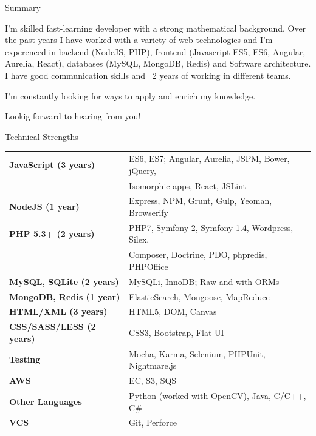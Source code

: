 \documentclass{resume} %
\begin{document}

\begin{rSection}{Summary}

I'm skilled fast-learning developer with a strong mathematical background. Over the past years I have worked with a variety of web technologies and I'm experenced in backend (NodeJS, PHP), frontend (Javascript ES5, ES6, Angular, Aurelia, React), databases (MySQL, MongoDB, Redis) and Software architecture. I have good communication skills and ~2 years of working in different teams.

I'm constantly looking for ways to apply and enrich my knowledge. 

Lookig forward to hearing from you!

\end{rSection}



\begin{rSection}{Technical Strengths}

\begin{tabular}{ @{} >{\bfseries}l @{\hspace{6ex}} l }
JavaScript (3 years) & ES6, ES7; Angular, Aurelia, JSPM, Bower, jQuery, \\
 & Isomorphic apps, React, JSLint \\
NodeJS (1 year) & Express, NPM, Grunt, Gulp, Yeoman, Browserify \\
PHP 5.3+ (2 years) & PHP7, Symfony 2, Symfony 1.4, Wordpress, Silex, \\
 & Composer, Doctrine, PDO, phpredis, PHPOffice \\
MySQL, SQLite (2 years) & MySQLi, InnoDB; Raw and with ORMs \\
MongoDB, Redis (1 year) & ElasticSearch, Mongoose, MapReduce \\
HTML/XML (3 years) & HTML5, DOM, Canvas \\
CSS/SASS/LESS (2 years) & CSS3, Bootstrap, Flat UI \\
Testing & Mocha, Karma, Selenium, PHPUnit, Nightmare.js \\
AWS & EC, S3, SQS  \\
Other Languages & Python (worked with OpenCV), Java, C/C++, C\# \\
VCS & Git, Perforce \\
\end{tabular}

\end{rSection}
\end{document}
